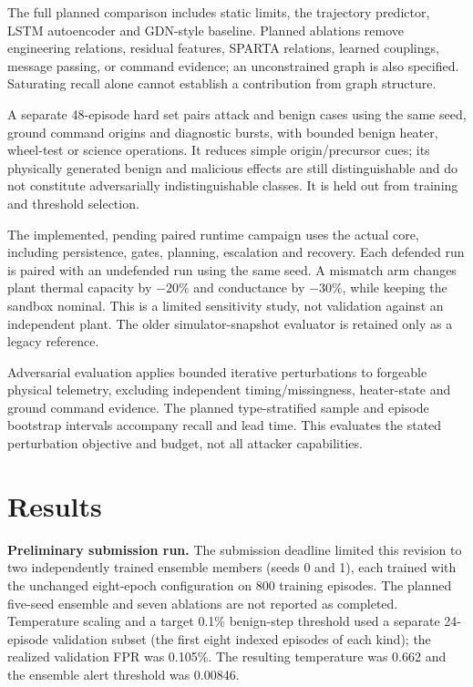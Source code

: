 \documentclass[10pt,a4paper,twocolumn]{article}
\begin{document}
The full planned comparison includes static limits, the trajectory predictor, LSTM autoencoder and GDN-style baseline. Planned ablations remove engineering relations, residual features, SPARTA relations, learned couplings, message passing, or command evidence; an unconstrained graph is also specified. Saturating recall alone cannot establish a contribution from graph structure.

A separate 48-episode hard set pairs attack and benign cases using the same seed, ground command origins and diagnostic bursts, with bounded benign heater, wheel-test or science operations. It reduces simple origin/precursor cues; its physically generated benign and malicious effects are still distinguishable and do not constitute adversarially indistinguishable classes. It is held out from training and threshold selection.

The implemented, pending paired runtime campaign uses the actual core, including persistence, gates, planning, escalation and recovery. Each defended run is paired with an undefended run using the same seed. A mismatch arm changes plant thermal capacity by $-20\%$ and conductance by $-30\%$, while keeping the sandbox nominal. This is a limited sensitivity study, not validation against an independent plant. The older simulator-snapshot evaluator is retained only as a legacy reference.

Adversarial evaluation applies bounded iterative perturbations to forgeable physical telemetry, excluding independent timing/missingness, heater-state and ground command evidence. The planned type-stratified sample and episode bootstrap intervals accompany recall and lead time. This evaluates the stated perturbation objective and budget, not all attacker capabilities.

\section{Results}
\textbf{Preliminary submission run.} The submission deadline limited this revision to two independently trained ensemble members (seeds 0 and 1), each trained with the unchanged eight-epoch configuration on 800 training episodes. The planned five-seed ensemble and seven ablations are not reported as completed. Temperature scaling and a target 0.1\% benign-step threshold used a separate 24-episode validation subset (the first eight indexed episodes of each kind); the realized validation FPR was 0.105\%. The resulting temperature was 0.662 and the ensemble alert threshold was 0.00846.
\end{document}

